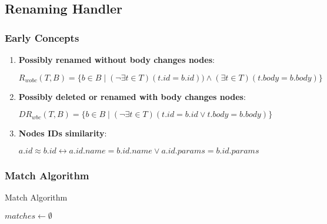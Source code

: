 \documentclass[../../Algorithms.tex]{subfiles}
\begin{document}
    \subsection{Renaming Handler}
    \subsubsection{Early Concepts}

    \begin{enumerate}
        \item \textbf{Possibly renamed without body changes nodes}:

        $R_{wobc}(T, B) = \{ b \in B \mid (\lnot \exists t \in T) (t.id = b.id)) \land (\exists t \in T) (t.body = b.body)\}$

        \item \textbf{Possibly deleted or renamed with body changes nodes}:
        
        $DR_{wbc}(T, B) = \{ b \in B \mid (\lnot \exists t \in T) (t.id = b.id \lor t.body = b.body)\}$

        \item \textbf{Nodes IDs similarity}:
        
        $a.id \approx b.id \leftrightarrow a.id.name = b.id.name \lor a.id.params = b.id.params$
    \end{enumerate}

    \subsubsection{Match Algorithm}
    
    \begin{algorithm}[H]
        \caption{Match Algorithm}
        \SetAlgoLined

        
        \BlankLine
        
        $matches \leftarrow \emptyset$\;

        \BlankLine
    \end{algorithm}
\end{document}
